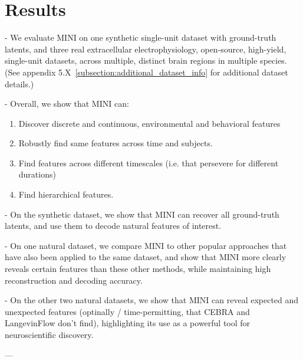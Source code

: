 \section{Results}
\label{section:results}

- We evaluate MINI on one synthetic single-unit dataset with ground-truth latents, and three real extracellular electrophysiology, open-source, high-yield, single-unit datasets, across multiple, distinct brain regions in multiple species. (See appendix 5.X~\ref{subsection:additional_dataset_info} for additional dataset details.)

- Overall, we show that MINI can:
\begin{enumerate}
    \item Discover discrete and continuous, environmental and behavioral features
    \item Robustly find same features across time and subjects.
    \item Find features across different timescales (i.e. that persevere for different durations)
    \item Find hierarchical features.
\end{enumerate}    

- On the synthetic dataset, we show that MINI can recover all ground-truth latents, and use them to decode natural features of interest.

- On one natural dataset, we compare MINI to other popular approaches that have also been applied to the same dataset, and show that MINI more clearly reveals certain features than these other methods, while maintaining high reconstruction and decoding accuracy.

- On the other two natural datasets, we show that MINI can reveal expected and unexpected features (optinally / time-permitting, that CEBRA and LangevinFlow don't find), highlighting its use as a powerful tool for neuroscientific discovery.

---







